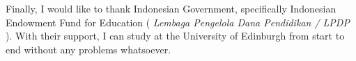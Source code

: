 \documentclass[msc,logo]{infthesis}  %
\begin{document}
\begin{preliminary}
\begin{acknowledgements}
\vspace{1cm}

Finally, I would like to thank Indonesian Government, specifically Indonesian Endowment Fund for Education ( \textit{Lembaga  Pengelola Dana Pendidikan / LPDP} ). With their support, I can study at the University of Edinburgh from start to end without any problems whatsoever. 
\end{acknowledgements}

\standarddeclaration


\tableofcontents

\listoffigures
\lstlistoflistings


\end{preliminary}













%








\appendix






\end{document}
